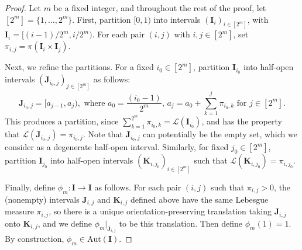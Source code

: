 \documentclass{article}
\theoremstyle{definition}
\begin{document}
\begin{proof}
    Let $m$ be a fixed integer, and throughout the rest of the proof, let $[2^m] = \{1,\ldots,2^m\}$. First, partition $[0,1)$  into intervals $(\mathbf{I}_i)_{i \in [2^m]}$, with $\mathbf{I}_i = [(i-1)/2^m, i/2^m)$. For each pair $(i,j)$ with $i,j \in [2^m]$, set $\pi_{i,j} = \pi(\mathbf{I}_i \times \mathbf{I}_j)$.

    Next, we refine the partitions. For a fixed $i_0 \in [2^m]$, partition $\mathbf{I}_{i_0}$ into half-open intervals $(\mathbf{J}_{i_0,j})_{j \in [2^m]}$ as follows:
    \[
    \mathbf{J}_{i_0,j} = [a_{j-1},a_{j}), \mbox{ where } a_0 = \frac{(i_0-1)}{2^m}, \, a_j = a_0 + \sum_{k=1}^{j} \pi_{i_0,k} \mbox{ for } j \in [2^m].
    \]
    This produces a partition, since $\sum_{k=1}^{2^m} \pi_{i_0,k} = \mathscr{L}(\mathbf{I}_{i_0})$, and has the property that $\mathscr{L}(\mathbf{J}_{i_0,j}) = \pi_{i_0,j}$.
    Note that $\mathbf{J}_{i_0,j}$ can potentially be the empty set, which we consider as a degenerate half-open interval.
    Similarly, for fixed $j_0 \in [2^m]$, partition $\mathbf{I}_{j_0}$ into half-open intervals $(\mathbf{K}_{i,j_0})_{i \in [2^m]}$ such that $\mathscr{L}(\mathbf{K}_{i,j_0}) = \pi_{i,j_0}$. 

    Finally, define $\phi_m:\mathbf{I} \to \mathbf{I}$ as follows. For each pair $(i,j)$ such that $\pi_{i,j} > 0$, the (nonempty) intervals $\mathbf{J}_{i,j}$ and $\mathbf{K}_{i,j}$ defined above have the same Lebesgue measure  $\pi_{i,j}$, so there is a unique orientation-preserving translation taking  $\mathbf{J}_{i,j}$ onto $\mathbf{K}_{i,j}$, and we define $\phi_m|_{\mathbf{J}_{i,j}}$ to be this translation. Then define $\phi_m(1) = 1$. By construction, $\phi_m \in \mathrm{Aut}(\mathbf{I})$.


\end{proof}
\end{document}
